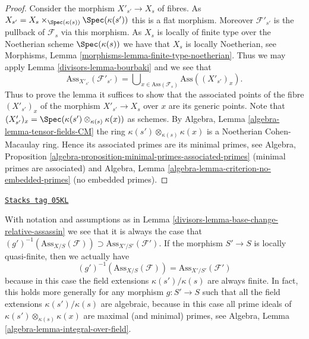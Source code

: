\begin{proof}

Consider the morphism $X'_{s'} \to X_s$ of fibres. As
$X_{s'} = X_s \times_{\Spec(\kappa(s))} \Spec(\kappa(s'))$
this is a flat morphism. Moreover $\mathcal{F}'_{s'}$ is the pullback
of $\mathcal{F}_s$ via this morphism. As $X_s$ is locally of finite
type over the Noetherian scheme $\Spec(\kappa(s))$ we have that
$X_s$ is locally Noetherian, see
Morphisms, Lemma \ref{morphisms-lemma-finite-type-noetherian}.
Thus we may apply
Lemma \ref{divisors-lemma-bourbaki}
and we see that
$$
\text{Ass}_{X'_{s'}}(\mathcal{F}'_{s'}) =
\bigcup\nolimits_{x \in \text{Ass}(\mathcal{F}_s)} \text{Ass}((X'_{s'})_x).
$$
Thus to prove the lemma it suffices to show that the associated points
of the fibre $(X'_{s'})_x$ of the morphism $X'_{s'} \to X_s$ over $x$
are its generic points. Note that
$(X'_{s'})_x = \Spec(\kappa(s') \otimes_{\kappa(s)} \kappa(x))$
as schemes. By
Algebra, Lemma \ref{algebra-lemma-tensor-fields-CM}
the ring $\kappa(s') \otimes_{\kappa(s)} \kappa(x)$ is a Noetherian
Cohen-Macaulay ring. Hence its associated primes are its minimal primes, see
Algebra, Proposition \ref{algebra-proposition-minimal-primes-associated-primes}
(minimal primes are associated) and
Algebra, Lemma \ref{algebra-lemma-criterion-no-embedded-primes}
(no embedded primes).
\end{proof}

\begin{remark}
\label{divisors-remark-base-change-relative-assassin}
\href{https://stacks.math.columbia.edu/tag/05KL}{\texttt{Stacks tag 05KL}}

With notation and assumptions as in
Lemma \ref{divisors-lemma-base-change-relative-assassin}
we see that it is always the case that
$(g')^{-1}(\text{Ass}_{X/S}(\mathcal{F})) \supset
\text{Ass}_{X'/S'}(\mathcal{F}')$.
If the morphism $S' \to S$ is locally quasi-finite, then we actually have
$$
(g')^{-1}(\text{Ass}_{X/S}(\mathcal{F}))
=
\text{Ass}_{X'/S'}(\mathcal{F}')
$$
because in this case the field extensions $\kappa(s')/\kappa(s)$
are always finite. In fact, this holds more generally for any morphism
$g : S' \to S$ such that all the field extensions
$\kappa(s')/\kappa(s)$ are algebraic, because in this case all
prime ideals of $\kappa(s') \otimes_{\kappa(s)} \kappa(x)$ are
maximal (and minimal) primes, see
Algebra, Lemma \ref{algebra-lemma-integral-over-field}.
\end{remark}

